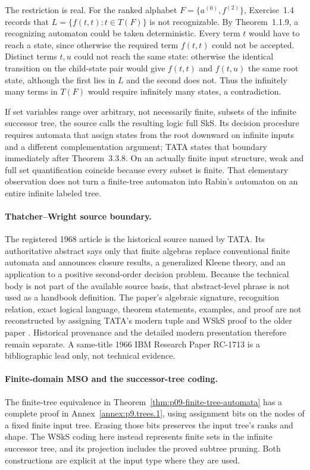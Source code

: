 The restriction is real.  For the ranked alphabet
\(F=\{a^{(0)},f^{(2)}\}\), Exercise~1.4 records that
\(L=\{f(t,t):t\in T(F)\}\) is not recognizable.  By Theorem~1.1.9, a
recognizing automaton could be taken deterministic.  Every term \(t\) would
have to reach a state, since otherwise the required term \(f(t,t)\) could not
be accepted.  Distinct terms \(t,u\) could not reach the same state: otherwise
the identical transition on the child-state pair would give \(f(t,t)\) and
\(f(t,u)\) the same root state, although the first lies in \(L\) and the second
does not.  Thus the infinitely many terms in \(T(F)\) would require infinitely
many states, a contradiction.

If set variables range over arbitrary, not necessarily finite, subsets of the
infinite successor tree, the source calls the resulting logic full SkS.  Its
decision procedure requires automata that assign states from the root downward
on infinite inputs and a different complementation argument; TATA states that
boundary immediately
after Theorem~3.3.8.  On an actually finite input structure, weak and full set
quantification coincide because every subset is finite.  That elementary
observation does not turn a finite-tree automaton into Rabin's automaton on an
entire infinite labeled tree.

\paragraph{Thatcher--Wright source boundary.}
The registered 1968 article is the historical source named by TATA.  Its
authoritative abstract says only that finite algebras replace conventional
finite automata and announces closure results, a generalized Kleene theory,
and an application to a positive second-order decision problem.  Because the
technical body is not part of the available source basis, that abstract-level
phrase is not used as a handbook definition.  The paper's algebraic signature,
recognition relation, exact logical language, theorem statements, examples, and
proof are not reconstructed by assigning TATA's modern tuple and WSkS proof to the older
paper \cite{ThatcherWright1968}.  Historical provenance and the detailed
modern presentation therefore remain separate.  A same-title 1966 IBM
Research Paper RC-1713 is a bibliographic lead only, not technical evidence.

\paragraph{Finite-domain MSO and the successor-tree coding.}
The finite-tree equivalence in Theorem~\ref{thm:p09-finite-tree-automata}
has a complete proof in Annex~\ref{annex:p9.trees.1}, using assignment
bits on the nodes of a fixed finite input tree.
Erasing those bits preserves the input tree's ranks and shape.
The WSkS coding here instead represents finite sets in the infinite
successor tree, and its projection includes the proved subtree pruning.
Both constructions are explicit at the input type where they are used.
